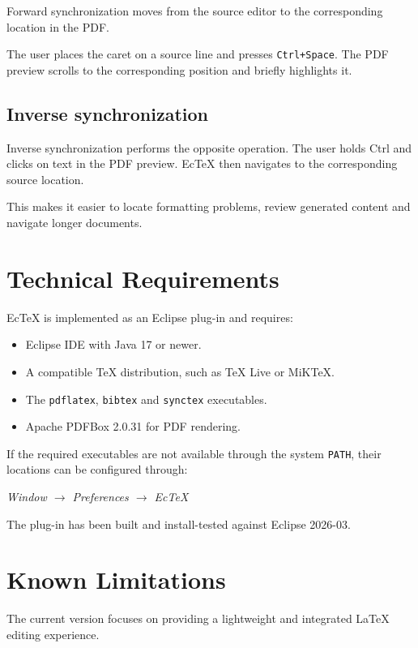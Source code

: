 \documentclass[11pt,a4paper]{article}
\begin{document}
Forward synchronization moves from the source editor
to the corresponding location in the PDF.

The user places the caret on a source line and presses
\texttt{Ctrl+Space}. The PDF preview scrolls to the
corresponding position and briefly highlights it.

\subsection{Inverse synchronization}

Inverse synchronization performs the opposite operation.
The user holds Ctrl and clicks on text in the PDF preview.
EcTeX then navigates to the corresponding source location.

This makes it easier to locate formatting problems,
review generated content and navigate longer documents.

\section{Technical Requirements}

EcTeX is implemented as an Eclipse plug-in and requires:

\begin{itemize}[noitemsep]
    \item Eclipse IDE with Java 17 or newer.
    \item A compatible TeX distribution, such as TeX Live
    or MiKTeX.
    \item The \texttt{pdflatex}, \texttt{bibtex} and
    \texttt{synctex} executables.
    \item Apache PDFBox 2.0.31 for PDF rendering.
\end{itemize}

If the required executables are not available through
the system \texttt{PATH}, their locations can be
configured through:

\begin{center}
\textit{Window $\rightarrow$ Preferences $\rightarrow$ EcTeX}
\end{center}

The plug-in has been built and install-tested against
Eclipse 2026-03.

\section{Known Limitations}

The current version focuses on providing a lightweight
and integrated LaTeX editing experience.
\end{document}
